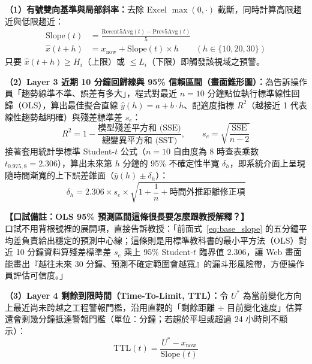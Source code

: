 \documentclass[fontset=none, a4paper, 12pt]{ctexart}
\begin{document}
\begin{doublespace}
\textbf{（1）有號雙向基準與局部斜率：}去除 Excel $\max(0,\cdot)$ 截斷，同時計算高限趨近與低限趨近：
\begin{align}
\mathrm{Slope}(t) &= \frac{\mathrm{Recent5Avg}(t) - \mathrm{Prev5Avg}(t)}{5} \nonumber \\
\hat{x}(t+h) &= x_{\mathrm{now}} + \mathrm{Slope}(t) \times h \qquad (h\in\{10,20,30\})
\label{eq:base_slope}
\end{align}
只要 $\hat{x}(t+h) \ge H_i$（上限）或 $\le L_i$（下限）即觸發該視域之預警。

\textbf{（2）Layer 3 近期 10 分鐘回歸線與 95\% 信賴區間（畫面錐形圖）：}為告訴操作員「趨勢線準不準、誤差有多大」，程式對最近 $n=10$ 分鐘點位執行標準線性回歸（OLS），算出最佳擬合直線 $\hat{y}(h) = a + b \cdot h$、配適度指標 $R^2$（越接近 1 代表線性趨勢越明確）與殘差標準差 $s_e$：
\begin{equation}
R^2 = 1 - \frac{\text{模型殘差平方和 (SSE)}}{\text{總變異平方和 (SST)}}, \qquad
s_e = \sqrt{\frac{\text{SSE}}{n - 2}}
\label{eq:ols_fit}
\end{equation}
接著套用統計學標準 Student-$t$ 公式（$n=10$ 自由度為 8 時查表乘數 $t_{0.975,8} = 2.306$），算出未來第 $h$ 分鐘的 95\% 不確定性半寬 $\delta_h$，即系統介面上呈現隨時間漸寬的上下誤差錐面（$\hat{y}(h) \pm \delta_h$）：
\begin{equation}
\delta_h = 2.306 \times s_e \times \sqrt{1 + \frac{1}{n} + \text{時間外推距離修正項}}
\label{eq:pred_band}
\end{equation}

\noindent\textbf{【口試備註：OLS 95\% 預測區間這條很長要怎麼跟教授解釋？】}\\
口試不用背根號裡的展開項，直接告訴教授：「前面式~\eqref{eq:base_slope} 的五分鐘平均差負責給出穩定的預測中心線；這條則是用標準教科書的最小平方法（OLS）對近 10 分鐘資料算殘差標準差 $s_e$ 乘上 95\% Student-$t$ 臨界值 $2.306$，讓 Web 畫面能畫出『越往未來 30 分鐘、預測不確定範圍會越寬』的漏斗形風險帶，方便操作員評估可信度。」

\textbf{（3）Layer 4 剩餘到限時間（Time-To-Limit, TTL）：}令 $U^*$ 為當前變化方向上最近尚未跨越之工程警報門檻，沿用直觀的「剩餘距離 $\div$ 目前變化速度」估算還會剩幾分鐘抵達警報門檻（單位：分鐘；若趨於平坦或超過 24 小時則不顯示）：
\begin{equation}
\mathrm{TTL}(t) = \frac{U^* - x_{\mathrm{now}}}{\mathrm{Slope}(t)}
\label{eq:ttl}
\end{equation}


\end{doublespace}
\end{document}
